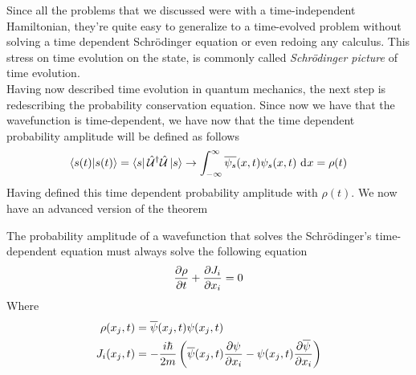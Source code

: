 \documentclass[../qm.tex]{subfiles}
\begin{document}
	Since all the problems that we discussed were with a time-independent Hamiltonian, they're quite easy to generalize to a time-evolved problem without solving a time dependent Schrödinger equation or even redoing any calculus.
	This stress on time evolution on the state, is commonly called \textit{Schrödinger picture} of time evolution.\\
	Having now described time evolution in quantum mechanics, the next step is redescribing the probability conservation equation. Since now we have that the wavefunction is time-dependent, we have now that the time dependent probability amplitude will be defined as follows
	\begin{equation*}
		\braket{s(t)}=\bra{s}\hat{\mathcal{U}}^{\dagger}\hat{\mathcal{U}}\ket{s}\to\int_{-\infty}^{\infty}\overline{\psi_s}(x,t)\psi_s(x,t)\ \mathrm{d}^{}x=\rho(t)
	\end{equation*}
	Having defined this time dependent probability amplitude with $\rho(t)$. We now have an advanced version of the theorem %
	\begin{thm}
		The probability amplitude of a wavefunction that solves the Schrödinger's time-dependent equation must always solve the following equation
		\begin{equation*}
			\pdv{\rho}{t}+\pdv{J_i}{x_i}=0
		\end{equation*}
		Where
		\begin{equation*}
			\begin{aligned}
				\rho(x_j,t)&=\overline{\psi}(x_j,t)\psi(x_j,t)\\
				J_i(x_j,t)&=-\frac{i\hbar}{2m}\left( \overline{\psi}(x_j,t)\pdv{\psi}{x_i}-\psi(x_j,t)\pdv{\overline{\psi}}{x_i} \right)
			\end{aligned}
		\end{equation*}
	\end{thm}
\end{document}
